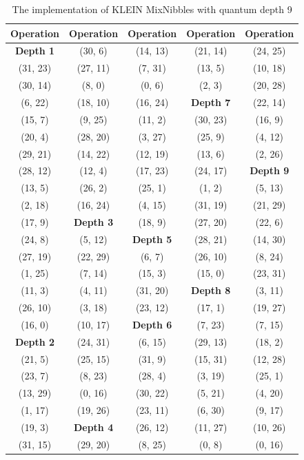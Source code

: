 \begin{table}[htbp]
\centering
\begin{tabular}{||c c c c c||} 
 \hline
 Operation & Operation & Operation & Operation & Operation \\ [0.5ex] 
 \hline\hline
 \textbf{Depth 1} & (30, 6) & (14, 13) & (21, 14) & (24, 25) \\ 
 (31, 23) & (27, 11) & (7, 31) & (13, 5) & (10, 18) \\
 (30, 14) & (8, 0) & (0, 6) & (2, 3) & (20, 28) \\
 (6, 22) & (18, 10) & (16, 24) & \textbf{Depth 7} & (22, 14) \\
 (15, 7) & (9, 25) & (11, 2) & (30, 23) & (16, 9)\\
 (20, 4) & (28, 20)& (3, 27) & (25, 9) & (4, 12)\\
 (29, 21) & (14, 22) & (12, 19) & (13, 6) & (2, 26)\\
 (28, 12) & (12, 4) & (17, 23) & (24, 17) & \textbf{Depth 9}\\
 (13, 5) & (26, 2) & (25, 1) & (1, 2) & (5, 13)\\
 (2, 18) & (16, 24) & (4, 15) & (31, 19) & (21, 29)\\
 (17, 9) & \textbf{Depth 3} & (18, 9) & (27, 20) & (22, 6)\\
 (24, 8) & (5, 12) & \textbf{Depth 5} & (28, 21) & (14, 30)\\
 (27, 19) & (22, 29) & (6, 7) & (26, 10) & (8, 24)\\
 (1, 25) & (7, 14) & (15, 3) & (15, 0) & (23, 31)\\
 (11, 3) & (4, 11) & (31, 20) & \textbf{Depth 8} & (3, 11)\\
 (26, 10) & (3, 18) & (23, 12) & (17, 1) & (19, 27)\\
 (16, 0) & (10, 17) & \textbf{Depth 6} & (7, 23) & (7, 15)\\
 \textbf{Depth 2} & (24, 31) & (6, 15) & (29, 13) & (18, 2)\\
 (21, 5) & (25, 15) & (31, 9) & (15, 31) & (12, 28)\\
 (23, 7) & (8, 23) & (28, 4) & (3, 19) & (25, 1)\\
 (13, 29) & (0, 16) & (30, 22) & (5, 21) & (4, 20)\\
 (1, 17) & (19, 26) & (23, 11) & (6, 30) & (9, 17)\\
 (19, 3) & \textbf{Depth 4} & (26, 12) & (11, 27) & (10, 26) \\
 (31, 15) & (29, 20) & (8, 25) & (0, 8) & (0, 16)\\
 \hline
\end{tabular}
\caption{The implementation of KLEIN MixNibbles with quantum depth 9}
\label{tab:depth-9-operations-klein-mixnibbles}
\end{table}